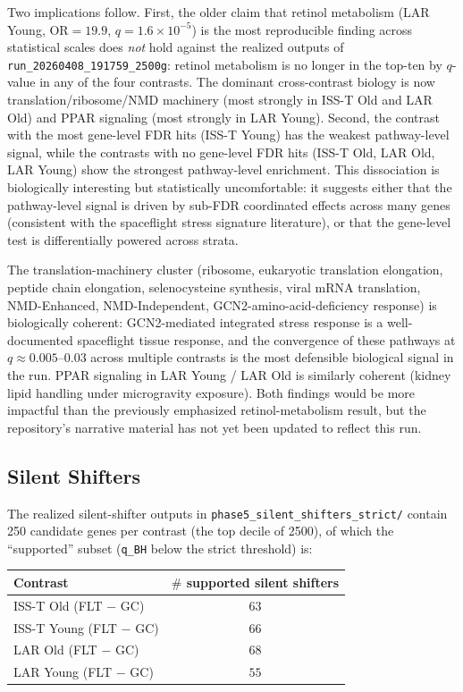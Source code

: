 \documentclass[11pt]{article}
\newcommand{\code}[1]{\texttt{#1}}
\begin{document}
\noindent Two implications follow. First, the older claim that retinol metabolism (LAR Young, OR$=19.9$, $q=1.6\times 10^{-5}$) is the most reproducible finding across statistical scales does \emph{not} hold against the realized outputs of \code{run\_20260408\_191759\_2500g}: retinol metabolism is no longer in the top-ten by $q$-value in any of the four contrasts. The dominant cross-contrast biology is now translation/ribosome/NMD machinery (most strongly in ISS-T Old and LAR Old) and PPAR signaling (most strongly in LAR Young). Second, the contrast with the most gene-level FDR hits (ISS-T Young) has the weakest pathway-level signal, while the contrasts with no gene-level FDR hits (ISS-T Old, LAR Old, LAR Young) show the strongest pathway-level enrichment. This dissociation is biologically interesting but statistically uncomfortable: it suggests either that the pathway-level signal is driven by sub-FDR coordinated effects across many genes (consistent with the spaceflight stress signature literature), or that the gene-level test is differentially powered across strata.

The translation-machinery cluster (ribosome, eukaryotic translation elongation, peptide chain elongation, selenocysteine synthesis, viral mRNA translation, NMD-Enhanced, NMD-Independent, GCN2-amino-acid-deficiency response) is biologically coherent: GCN2-mediated integrated stress response is a well-documented spaceflight tissue response, and the convergence of these pathways at $q\approx 0.005\text{--}0.03$ across multiple contrasts is the most defensible biological signal in the run. PPAR signaling in LAR Young / LAR Old is similarly coherent (kidney lipid handling under microgravity exposure). Both findings would be more impactful than the previously emphasized retinol-metabolism result, but the repository's narrative material has not yet been updated to reflect this run.

\subsection{Silent Shifters}

The realized silent-shifter outputs in \code{phase5\_silent\_shifters\_strict/} contain 250 candidate genes per contrast (the top decile of 2500), of which the ``supported'' subset (\code{q\_BH} below the strict threshold) is:

\begin{center}
\small
\begin{tabular}{lc}
\toprule
Contrast & $\#$ supported silent shifters \\
\midrule
ISS-T Old   (FLT $-$ GC) & $63$ \\
ISS-T Young (FLT $-$ GC) & $66$ \\
LAR Old     (FLT $-$ GC) & $68$ \\
LAR Young   (FLT $-$ GC) & $55$ \\
\bottomrule
\end{tabular}
\end{center}
\end{document}
